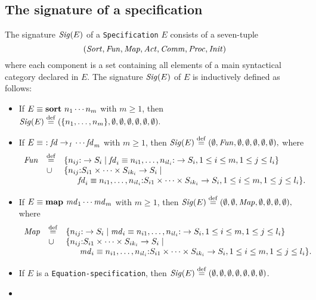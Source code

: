 \documentclass[fleqn,a4paper,dvips]{article}
\newcommand{\Sig}{\nm{Sig}}
\newcommand{\Fun}{\nm{Fun}}
\newcommand{\wor}{\stackrel{\mathrm{def}}{=}}
\begin{document}
\subsection{The signature of a specification}
\begin{defn}
  The signature $\Sig(E)$ of a {\tt Specification} $E$ consists of a
  seven-tuple \[(\Sort,\Fun,\Map,\Act,\Comm,\Proc,\Init)\] where
  each component is a set containing all elements of a main syntactical category
  declared in $E$.
  The signature $\Sig(E)$ of $E$ is inductively defined as follows:
  \newcommand{\fd}{{\it fd}}
  \newcommand{\md}{{\it md}}
  \newcommand{\pe}{{\it pe}}
  \newcommand{\ad}{{\it ad}}
  \begin{itemize}
  \item
    If $E\equiv \mathbf{sort}~n_1\cdots n_m$ with $m\geq 1$,
    then
    $\Sig(E)\wor(\{n_1,\ldots,n_m\},\emptyset,\emptyset,\emptyset,
    \emptyset,\emptyset,\emptyset).$
\item
If $E\equiv
\func~\fd_1\cdots \fd_m$ with $m\geq 1$,
then
$\Sig(E)\wor(\emptyset,\Fun,
\emptyset,\emptyset,
\emptyset,\emptyset,\emptyset),$
where \[\begin{array}{lll}
\Fun &\wor&
\{n_{ij}\ap \rightarrow S_i\mid \fd_i\equiv
n_{i1},\ldots,n_{il_i}\ap \rightarrow S_i, 1\leq i\leq m, 1\leq j\leq
l_i\}\\
&\cup&\{n_{ij}\ap S_{i1}\times\cdots\times S_{ik_i}\rightarrow S_i\mid\\
&&~~~~~\fd_i\equiv
n_{i1},\ldots,n_{il_i}\ap S_{i1}\times\cdots\times S_{ik_i}\rightarrow
S_i, 1\leq i\leq
m, 1\leq j\leq l_i\}.
\end{array}
\]
\item
If $E\equiv
\mapkw~\md_1\cdots \md_m$ with $m\geq 1$,
then
$\Sig(E)\wor(\emptyset,\emptyset,\Map, \emptyset,\emptyset,
\emptyset,\emptyset),$
where \[\begin{array}{lll}
\Map &\wor&
\{n_{ij}\ap \rightarrow S_i\mid \md_i\equiv
n_{i1},\ldots,n_{il_i}\ap \rightarrow S_i, 1\leq i\leq m, 1\leq j\leq
l_i\}\\
&\cup&\{n_{ij}\ap S_{i1}\times\cdots\times S_{ik_i}\rightarrow S_i\mid\\
&&~~~~~\md_i\equiv
n_{i1},\ldots,n_{il_i}\ap S_{i1}\times\cdots\times S_{ik_i}\rightarrow
S_i, 1\leq i\leq
m, 1\leq j\leq l_i\}.
\end{array}
\]
\item
If $E$ is a {\tt Equation-specification},
then
$\Sig(E)\wor(\emptyset,\emptyset,\emptyset,\emptyset,\emptyset,\emptyset,\emptyset)$.
\item

\end{itemize}
\end{defn}
\end{document}
